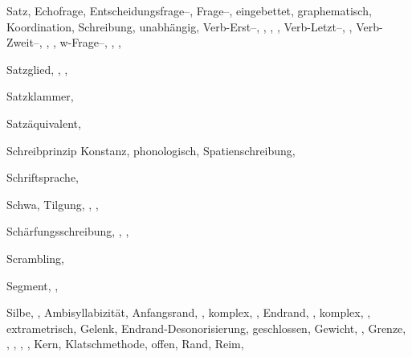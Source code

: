 \begin{theindex}
  \item Satz, 
    \subitem Echofrage, 
    \subitem Entscheidungsfrage--, 
    \subitem Frage--, 
      \subsubitem eingebettet, 
    \subitem graphematisch, 
    \subitem Koordination, 
    \subitem Schreibung, 
    \subitem unabhängig, 
    \subitem Verb-Erst--, , , 
		, 
    \subitem Verb-Letzt--, , 
    \subitem Verb-Zweit--, , , 
    \subitem w-Frage--, , , 
  \item Satzglied, , , 
  \item Satzklammer, 
  \item Satzäquivalent, 
  \item Schreibprinzip
    \subitem Konstanz, 
    \subitem phonologisch, 
    \subitem Spatienschreibung, 
  \item Schriftsprache, 
  \item Schwa, 
    \subitem Tilgung, , , 
  \item Schärfungsschreibung, , , 
  \item Scrambling, 
  \item Segment, , 
  \item Silbe, , 
    \subitem Ambisyllabizität, 
    \subitem Anfangsrand, , 
      \subsubitem komplex, , 
    \subitem Endrand, , 
      \subsubitem komplex, , 
    \subitem extrametrisch, 
    \subitem Gelenk, 
      \subsubitem Endrand-Desonorisierung, 
    \subitem geschlossen, 
    \subitem Gewicht, , 
    \subitem Grenze, , , , 
		, 
    \subitem Kern, 
    \subitem Klatschmethode, 
    \subitem offen, 
    \subitem Rand, 
    \subitem Reim, 

\end{theindex}
